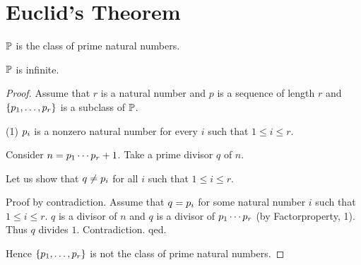 \documentclass[11pt]{article}
\begin{document}
\section{Euclid's Theorem}

\begin{forthel}

\begin{signature} $\mathbb{P}$ is the class of prime natural numbers.
\end{signature}



\begin{theorem}[Euclid]
$\mathbb{P}$ is infinite.
\end{theorem}
\begin{proof}
Assume that $r$ is a natural number and 
$p$ is a sequence of length $r$ and
$\{p_{1},\dots,p_{r}\}$ is a subclass of $\mathbb{P}$.

(1) $p_{i}$ is a nonzero natural number for every $i$ such
that $1 \leq i \leq r$.

Consider $n=p_{1} \cdots p_{r}+1$.
Take a prime divisor $q$ of $n$.

Let us show that $q \neq p_{i}$ for all $i$ such that 
$1 \leq i \leq r$.

Proof by contradiction.
Assume that $q=p_{i}$ for some natural number $i$ such that
$1 \leq i \leq r$.
$q$ is a divisor of $n$ and $q$ is a divisor of $p_{1} \cdots p_{r}$
(by Factorproperty, 1).
Thus $q$ divides $1$. Contradiction. qed.

Hence $\{p_{1},\dots,p_{r}\}$ is not the class of prime natural numbers.
\end{proof}
\end{forthel}
\end{document}
